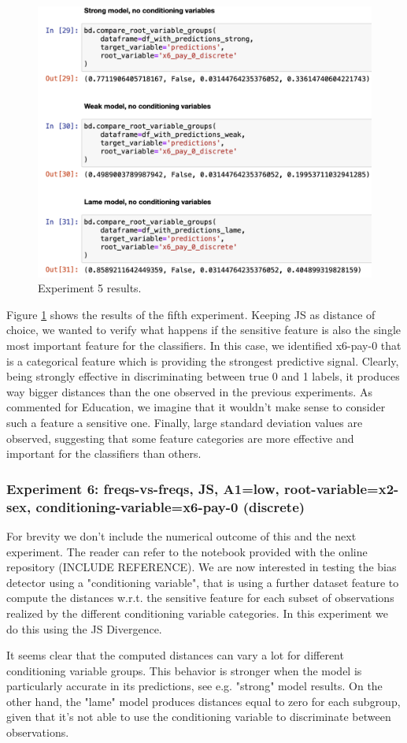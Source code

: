 \documentclass[
]{ceurart}
\begin{document}
\begin{figure}[h!]
  \includegraphics[width=.7\linewidth, left]{exp5.png}
  \caption{Experiment 5 results.}
  \label{fig:exp5}
\end{figure}
Figure \ref{fig:exp5} shows the results of the fifth experiment. Keeping JS as distance of choice, we wanted to verify what happens if the sensitive feature is also the single most important feature for the classifiers. In this case, we identified x6-pay-0 that is a categorical feature which is providing the strongest predictive signal. Clearly, being strongly effective in discriminating between true 0 and 1 labels, it produces way bigger distances than the one observed in the previous experiments. As commented for Education, we imagine that it wouldn't make sense to consider such a feature a sensitive one. Finally, large standard deviation values are observed, suggesting that some feature categories are more effective and important for the classifiers than others. 

\subsubsection{Experiment 6: freqs-vs-freqs, JS, A1=low, root-variable=x2-sex, conditioning-variable=x6-pay-0 (discrete)}
For brevity we don't include the numerical outcome of this and the next experiment. The reader can refer to the notebook provided with the online repository (INCLUDE REFERENCE). We are now interested in testing the bias detector using a "conditioning variable", that is using a further dataset feature to compute the distances w.r.t. the sensitive feature for each subset of observations realized by the different conditioning variable categories. In this experiment we do this using the JS Divergence. 

It seems clear that the computed distances can vary a lot for different conditioning variable groups. This behavior is stronger when the model is particularly accurate in its predictions, see e.g. "strong" model results. On the other hand, the "lame" model produces distances equal to zero for each subgroup, given that it's not able to use the conditioning variable to discriminate between observations. 
\end{document}
